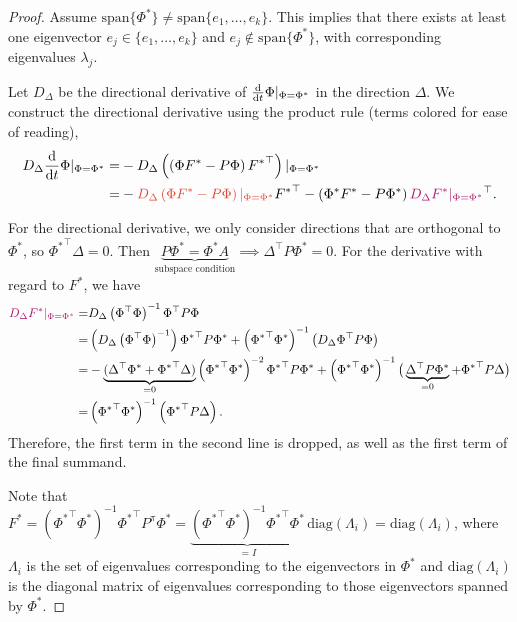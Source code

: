 \begin{proof}
Assume $\mathrm{span}\{\Phi^*\} \neq \mathrm{span}\{e_1,\dots,e_k\}$. This implies that there exists at least one eigenvector $e_j \in \{e_1,\dots,e_k\}$ and $e_j \notin \mathrm{span}\{\Phi^*\}$, with corresponding eigenvalues $\lambda_j$.

Let $D_\Delta$ be the directional derivative of $\frac{\mathrm{d}}{\mathrm{d} t} \Phi |_{\Phi=\Phi^*}$ in the direction $\Delta$.
We construct the directional derivative using the product rule (terms colored for ease of reading),
\begin{align}
D_\Delta \ddt{t} \Phi |_{\Phi=\Phi^*} = & -D_\Delta \left(\left(\Phi F^* - P \Phi\right) {F^*}^\top\right)|_{\Phi=\Phi^*}\\
     = & -{\color{uoftred}D_\Delta \left(\Phi F^* - P \Phi\right)|_{\Phi=\Phi^*}} {F^*}^\top - \left(\Phi^* F^* - P \Phi^*\right) {\color{uoftmagenta}D_\Delta {F^*}|_{\Phi=\Phi^*}}^\top.
\end{align}

For the directional derivative, we only consider directions that are orthogonal to $\Phi^*$, so ${\Phi^*}^\top\Delta = 0$. Then $\underbrace{P{\Phi^*} = {\Phi^*} A}_{\text{subspace condition}} \implies \Delta^\top P \Phi^* = 0.$
For the derivative with regard to $F^*$, we have
\begin{align}
    {\color{uoftmagenta}D_\Delta F^*|_{\Phi = \Phi^*}} =& D_\Delta \left(\Phi^\top \Phi\right)^{-1}\Phi^\top P \Phi\nonumber\\
    =& \left(D_\Delta \left(\Phi^\top \Phi\right)^{-1} \right) {\Phi^*}^\top P {\Phi^*} + \left({\Phi^*}^\top {\Phi^*}\right)^{-1} \left(D_\Delta \Phi^\top P \Phi  \right)\nonumber\\
    =& -\underbrace{(\Delta^\top \Phi^* + {\Phi^*}^\top \Delta)}_{=0}\left({\Phi^*}^\top {\Phi^*}\right)^{-2}{\Phi^*}^\top P {\Phi^*} + \left({\Phi^*}^\top {\Phi^*}\right)^{-1}\big(\underbrace{\Delta^\top P {\Phi^*}}_{=0} + {\Phi^*}^\top P \Delta\big)\nonumber\\
    =& \left({\Phi^*}^\top {\Phi^*}\right)^{-1}\left({\Phi^*}^\top P \Delta\right). \label{eq2}
\end{align}
Therefore, the first term in the second line is dropped, as well as the first term of the final summand.

Note that $F^* = \left({\Phi^*}^\top{\Phi^*}\right)^{-1} {\Phi^*}^\top P^\pi {\Phi^*} = \underbrace{\left({\Phi^*}^\top{\Phi^*}\right)^{-1} {\Phi^*}^\top {\Phi^*}}_{=I}\, \mathrm{diag}(\Lambda_i) = \mathrm{diag}(\Lambda_i)$, where $\Lambda_i$ is the set of eigenvalues corresponding to the eigenvectors in $\Phi^*$ and $\mathrm{diag}(\Lambda_i)$ is the diagonal matrix of eigenvalues corresponding to those eigenvectors spanned by $\Phi^*$.


\end{proof}
